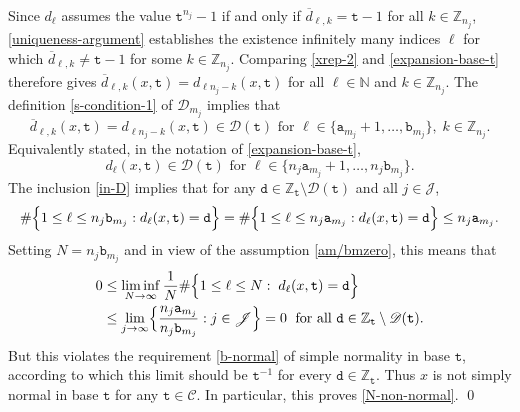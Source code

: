 \documentclass[12pt, twoside]{article}
\theoremstyle{definition}
\numberwithin{equation}{section}
\begin{document}
Since $d_{\ell}$ assumes the value $\mathtt t^{n_j}-1$ if and only if $\overline{d}_{\ell, k} = \mathtt t-1$ for all $k \in \mathbb Z_{n_j}$, \eqref{uniqueness-argument} establishes the existence infinitely many indices $\ell$ for which $\overline{d}_{\ell, k} \neq \mathtt t - 1$ for some $k \in \mathbb Z_{n_j}$. 
Comparing \eqref{xrep-2} and \eqref{expansion-base-t} therefore gives $\overline{d}_{\ell, k}(x, \mathtt t) = d_{\ell n_j-k}(x, \mathtt t)$ for all $\ell \in \mathbb N$ and $k \in \mathbb Z_{n_j}$. The definition \eqref{s-condition-1} of $\mathscr{D}_{m_j}$ implies that  
\[ \overline{d}_{\ell, k}(x, \mathtt t) = d_{\ell n_j-k}(x, \mathtt t) \in \mathscr{D}(\mathtt t) \text{ for }  \ell \in \bigl\{\mathtt a_{m_j}+1, \ldots, \mathtt b_{m_j} \bigr\}, \; k \in \mathbb Z_{n_j}.\] 
Equivalently stated, in the notation of \eqref{expansion-base-t},
\begin{equation} 
 \label{in-D} 
d_{\ell}(x, \mathtt t) \in \mathscr{D}(\mathtt t) \text{ for } \ell \in \bigl\{n_j \mathtt a_{m_j} +1, \ldots, n_j \mathtt b_{m_j}\bigr\}.
\end{equation} 
The inclusion \eqref{in-D} implies that for any $\mathtt d \in \mathbb Z_{\mathtt t}\setminus \mathscr{D}(\mathtt t)$ and all $j \in \mathscr{J}$,  
\begin{equation*} \label{no-d-in-an-bn}  
 \# \Bigl\{1 \leq \ell \leq  n_j \mathtt b_{m_j} : d_\ell(x, \mathtt t) =  \mathtt d \Bigr\} = \# \Bigl\{1 \leq \ell \leq n_j \mathtt a_{m_j} : d_\ell(x, \mathtt t) = \mathtt d \Bigr\}  \leq n_j \mathtt a_{m_j}.
\end{equation*}  
Setting $N = n_j \mathtt b_{m_j}$ and in view of the assumption \eqref{am/bmzero}, this means that 
\begin{align*} 
0 &\leq \liminf_{N \rightarrow \infty} \frac{1}{N} \# \Bigl\{1 \leq \ell \leq N : \; d_\ell(x, \mathtt t) = \mathtt d \Bigr\} \\ &\leq \lim_{j \rightarrow \infty} 
 \Bigl\{\frac{n_j \mathtt a_{m_j}}{n_j \mathtt b_{m_j}} : j \in \mathscr{J} \Bigr\} = 0  \; \text{ for all } \mathtt d \in \mathbb Z_{\mathtt t} \setminus \mathscr{D}(\mathtt t).  \end{align*}  But this violates the requirement \eqref{b-normal} of simple normality in base $\mathtt t$, according to which this limit should be $\mathtt t^{-1}$ for every $\mathtt d \in \mathbb Z_{\mathtt t}$. Thus $x$ is not simply normal in base $\mathtt t$ for any $\mathtt t \in \mathscr{C}$. In particular, this proves \eqref{N-non-normal}.  \qed
\end{document}
